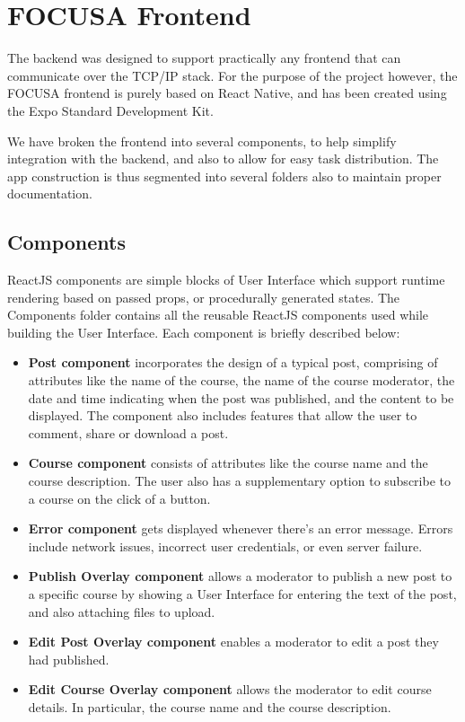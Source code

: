 \section{FOCUSA Frontend}
The backend was designed to support practically any frontend that can communicate over the TCP/IP stack.
For the purpose of the project however, the FOCUSA frontend is purely based on React Native, 
and has been created using the Expo Standard Development Kit. 

We have broken the frontend into several components, to help simplify integration with the backend, 
and also to allow for easy task distribution. The app construction is thus segmented into several folders 
also to maintain proper documentation.

\subsection{Components}
ReactJS components are simple blocks of User Interface which support runtime rendering based on passed props, 
or procedurally generated states.
The Components folder contains all the reusable ReactJS components used while building the User Interface. 
Each component is briefly described below:
\begin{itemize}
    \item \textbf{Post component} incorporates the design of a typical post, comprising of attributes like the 
    name of the course, the name of the course moderator, the date and time indicating when the post was 
    published, and the content to be displayed. The component also includes features that allow the user 
    to comment, share or download a post.
    \item \textbf{Course component} consists of attributes like the course name and the course description. 
    The user also has a supplementary option to subscribe to a course on the click of a button.
    \item \textbf{Error component} gets displayed whenever there's an error message. Errors include network issues, 
    incorrect user credentials, or even server failure.
    \item \textbf{Publish Overlay component} allows a moderator to publish a new post to a specific course by showing a 
    User Interface for entering the text of the post, and also attaching files to upload.
    \item \textbf{Edit Post Overlay component} enables a moderator to edit a post they had published.
    \item \textbf{Edit Course Overlay component} allows the moderator to edit course details. In particular, the course name and the course description.
\end{itemize}

